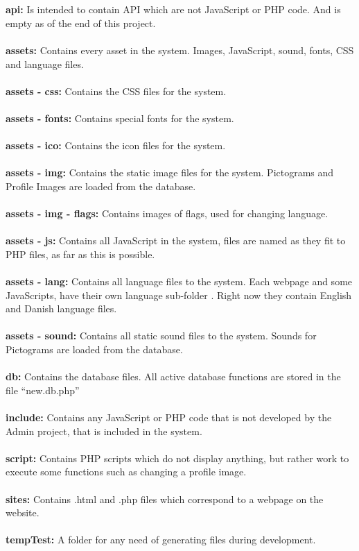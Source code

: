 \\
\\
\textbf{api:} Is intended to contain API which are not JavaScript or PHP code. And is empty as of the end of this project.\\
\\
\textbf{assets:} Contains every asset in the system. Images, JavaScript, sound, fonts, CSS and language files.\\
\\
\textbf{assets - css:} Contains the CSS files for the system.\\
\\
\textbf{assets - fonts:} Contains special fonts for the system.\\
\\
\textbf{assets - ico:} Contains the icon files for the system.\\
\\
\textbf{assets - img:} Contains the static image files for the system. Pictograms and Profile Images are loaded from the database.\\
\\
\textbf{assets - img - flags:} Contains images of flags, used for changing language.\\
\\
\textbf{assets - js:} Contains all JavaScript in the system, files are named as they fit to PHP files, as far as this is possible.\\
\\
\textbf{assets - lang:} Contains all language files to the system. Each webpage and some JavaScripts, have their own language sub-folder . Right now they contain English and Danish language files.\\
\\
\textbf{assets - sound:} Contains all static sound files to the system. Sounds for Pictograms are loaded from the database.\\
\\
\textbf{db:} Contains the database files. All active database functions are stored in the file ``new.db.php''\\
\\
\textbf{include:} Contains any JavaScript or PHP code that is not developed by the Admin project, that is included in the system.\\
\\
\textbf{script:} Contains PHP scripts which do not display anything, but rather work to execute some functions such as changing a profile image.\\
\\
\textbf{sites:} Contains .html and .php files which correspond to a webpage on the website.\\
\\
\textbf{tempTest:} A folder for any need of generating files during development.

